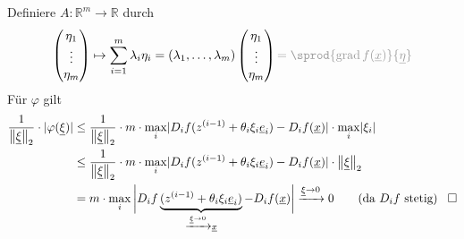 Definiere $A : \mathds{R}^m \to \mathds{R}$ durch 
\[
	\begin{pmatrix}
	\eta_1 \\ \vdots \\ \eta_m
\end{pmatrix} \mapsto \sum_{i=1}^{m} \lambda_i \eta_i = (\lambda_1, \ldots , \lambda_m)\begin{pmatrix}
	\eta_1 \\ \vdots \\ \eta_m
\end{pmatrix} {\color{light_gray} = \sprod{\grad f(\underline{x})}{\underline{\eta}} }
\]
Für $\varphi$ gilt
\begin{align*}
	\frac{1}{\norm[2]{\underline{\xi}}} \cdot \abs{\varphi (\underline{\xi} )} &\le \frac{1}{\norm[2]{\underline{\xi}}} \cdot m \cdot \max_i 
	\abs{D_i f \enbrace{z^{(i-1)} + \theta_i \xi_i \underline{e}_i } - D_i f (\underline{x}) } \cdot \max_i \abs{\xi_i}\\
	&\le \frac{1}{\norm[2]{\underline{\xi} } } \cdot m \cdot \max_i \abs{D_i f \enbrace{z^{(i-1)} + \theta_i \xi_i \underline{e}_i } - D_i f (\underline{x}) } \cdot 
	\norm[2]{\underline{\xi} }   \\
	&= m \cdot \max_i \bigg| D_i f \underbrace{\enbrace{z^{(i-1)} + \theta_i \xi_i \underline{e}_i }}_{\xrightarrow{\underline{\xi}  \to 0} \underline{x}  } 
	- D_i f (\underline{x}) \bigg| \xrightarrow{\underline{\xi}  \to 0} 0  \tag*{(da $D_i f$ stetig) \enspace $\square$}
\end{align*}

